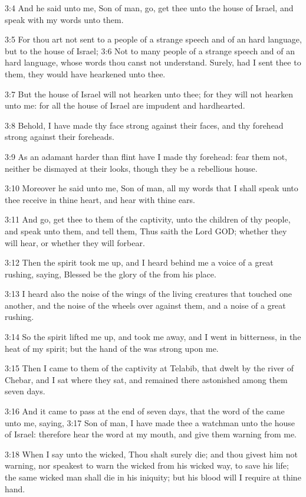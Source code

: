3:4 And he said unto me, Son of man, go, get thee unto the house of
Israel, and speak with my words unto them.

3:5 For thou art not sent to a people of a strange speech and of an
hard language, but to the house of Israel; 3:6 Not to many people of a
strange speech and of an hard language, whose words thou canst not
understand. Surely, had I sent thee to them, they would have hearkened
unto thee.

3:7 But the house of Israel will not hearken unto thee; for they will
not hearken unto me: for all the house of Israel are impudent and
hardhearted.

3:8 Behold, I have made thy face strong against their faces, and thy
forehead strong against their foreheads.

3:9 As an adamant harder than flint have I made thy forehead: fear
them not, neither be dismayed at their looks, though they be a
rebellious house.

3:10 Moreover he said unto me, Son of man, all my words that I shall
speak unto thee receive in thine heart, and hear with thine ears.

3:11 And go, get thee to them of the captivity, unto the children of
thy people, and speak unto them, and tell them, Thus saith the Lord
GOD; whether they will hear, or whether they will forbear.

3:12 Then the spirit took me up, and I heard behind me a voice of a
great rushing, saying, Blessed be the glory of the \LORD from his
place.

3:13 I heard also the noise of the wings of the living creatures that
touched one another, and the noise of the wheels over against them,
and a noise of a great rushing.

3:14 So the spirit lifted me up, and took me away, and I went in
bitterness, in the heat of my spirit; but the hand of the \LORD was
strong upon me.

3:15 Then I came to them of the captivity at Telabib, that dwelt by
the river of Chebar, and I sat where they sat, and remained there
astonished among them seven days.

3:16 And it came to pass at the end of seven days, that the word of
the \LORD came unto me, saying, 3:17 Son of man, I have made thee a
watchman unto the house of Israel: therefore hear the word at my
mouth, and give them warning from me.

3:18 When I say unto the wicked, Thou shalt surely die; and thou
givest him not warning, nor speakest to warn the wicked from his
wicked way, to save his life; the same wicked man shall die in his
iniquity; but his blood will I require at thine hand.

